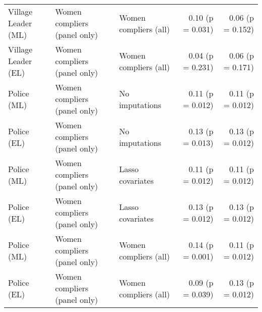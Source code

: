 \begin{tabular}{lllrr}
   Village Leader (ML) & Women compliers (panel only) & Women compliers (all) & 0.10 (p = 0.031) & 0.06 (p = 0.152) \\ 
   Village Leader (EL) & Women compliers (panel only) & Women compliers (all) & 0.04 (p = 0.231) & 0.06 (p = 0.171) \\ 
   Police (ML) & Women compliers (panel only) & No imputations & 0.11 (p = 0.012) & 0.11 (p = 0.012) \\ 
   Police (EL) & Women compliers (panel only) & No imputations & 0.13 (p = 0.013) & 0.13 (p = 0.012) \\ 
   Police (ML) & Women compliers (panel only) & Lasso covariates & 0.11 (p = 0.012) & 0.11 (p = 0.012) \\ 
   Police (EL) & Women compliers (panel only) & Lasso covariates & 0.13 (p = 0.012) & 0.13 (p = 0.012) \\ 
   Police (ML) & Women compliers (panel only) & Women compliers (all) & 0.14 (p = 0.001) & 0.11 (p = 0.012) \\ 
   Police (EL) & Women compliers (panel only) & Women compliers (all) & 0.09 (p = 0.039) & 0.13 (p = 0.012) \\ 
   \hline
\end{tabular}
